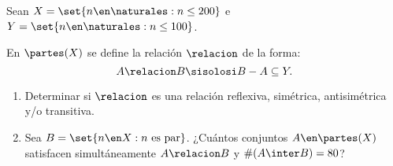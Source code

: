 \begin{enunciado}{\ejExtra}
  Sean $X = \set{n \en \naturales : n \leq 200}$ e $Y = \set{n\en \naturales : n \leq 100}$.\par
  En $\partes(X)$ se define la relación $\relacion$ de la forma:
  $$
    A \relacion B \sisolosi B - A \subseteq Y.
  $$
  \begin{enumerate}[label=\alph*)]
    \item Determinar si $\relacion$ es una relación reflexiva, simétrica, antisimétrica y/o transitiva.
    \item Sea $B = \set{n \en X : n \text{ es par} }$. ¿Cuántos conjuntos $A \en \partes(X)$ satisfacen simultáneamente
          $A \relacion B$ y $\#(A\inter B) = 80$?
  \end{enumerate}
\end{enunciado}

